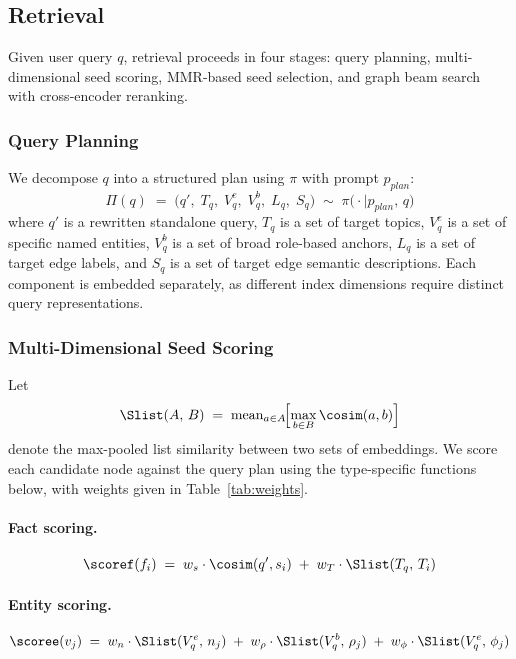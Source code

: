 \documentclass[runningheads]{llncs}
\begin{document}
\subsection{Retrieval}
 
Given user query $q$, retrieval proceeds in four stages: query planning,
multi-dimensional seed scoring, MMR-based seed selection, and graph beam search
with cross-encoder reranking.
 
\subsubsection*{Query Planning}
 
We decompose $q$ into a structured plan using $\pi$ with prompt $p_{plan}$:
\[
  \Pi(q) \;=\; \bigl(q',\; T_q,\; V_q^e,\; V_q^b,\; L_q,\; S_q\bigr)
  \;\sim\; \pi\!\bigl(\cdot \mid p_{plan},\, q\bigr)
\]
where $q'$ is a rewritten standalone query, $T_q$ is a set of target topics,
$V_q^e$ is a set of specific named entities, $V_q^b$ is a set of broad
role-based anchors, $L_q$ is a set of target edge labels, and $S_q$ is a set
of target edge semantic descriptions. Each component is embedded separately, as
different index dimensions require distinct query representations.
 
\subsubsection*{Multi-Dimensional Seed Scoring}
 
Let
\[
  \Slist(A,\, B) \;=\;
  \mathrm{mean}_{a \in A}\!\Bigl[\max_{b \in B} \cosim(a, b)\Bigr]
\]
denote the max-pooled list similarity between two sets of embeddings. We score
each candidate node against the query plan using the type-specific functions
below, with weights given in Table~\ref{tab:weights}.
 
\paragraph{Fact scoring.}
\[
  \scoref(f_i) \;=\;
  w_s \cdot \cosim(q', s_i) \;+\;
  w_T \cdot \Slist(T_q,\, T_i)
\]
 
\paragraph{Entity scoring.}
\[
  \scoree(v_j) \;=\;
  w_n \cdot \Slist(V_q^e,\, n_j) \;+\;
  w_\rho \cdot \Slist(V_q^b,\, \rho_j) \;+\;
  w_\phi \cdot \Slist(V_q^e,\, \phi_j)
\]
 
\end{document}
